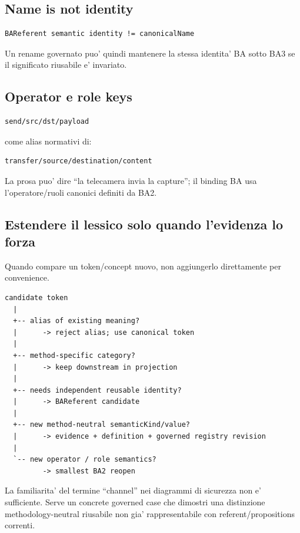 \documentclass[11pt,a4paper]{article}
\begin{document}
\subsection{Name is not identity}

\begin{lstlisting}
BAReferent semantic identity != canonicalName
\end{lstlisting}

Un rename governato puo' quindi mantenere la stessa identita' BA sotto BA3 se il significato riusabile e' invariato.

\subsection{Operator e role keys}

\begin{badbox}
\begin{lstlisting}
send/src/dst/payload
\end{lstlisting}
come alias normativi di:
\begin{lstlisting}
transfer/source/destination/content
\end{lstlisting}
\end{badbox}

\begin{goodbox}
La prosa puo' dire ``la telecamera invia la capture''; il binding BA usa l'operatore/ruoli canonici definiti da BA2.
\end{goodbox}


\subsection{Estendere il lessico solo quando l'evidenza lo forza}

Quando compare un token/concept nuovo, non aggiungerlo direttamente per convenience.

\begin{lstlisting}
candidate token
  |
  +-- alias of existing meaning?
  |      -> reject alias; use canonical token
  |
  +-- method-specific category?
  |      -> keep downstream in projection
  |
  +-- needs independent reusable identity?
  |      -> BAReferent candidate
  |
  +-- new method-neutral semanticKind/value?
  |      -> evidence + definition + governed registry revision
  |
  `-- new operator / role semantics?
         -> smallest BA2 reopen
\end{lstlisting}

\begin{examplebox}
La familiarita' del termine ``channel'' nei diagrammi di sicurezza non e' sufficiente. Serve un concrete governed case che dimostri una distinzione methodology-neutral riusabile non gia' rappresentabile con referent/propositions correnti.
\end{examplebox}
\end{document}
